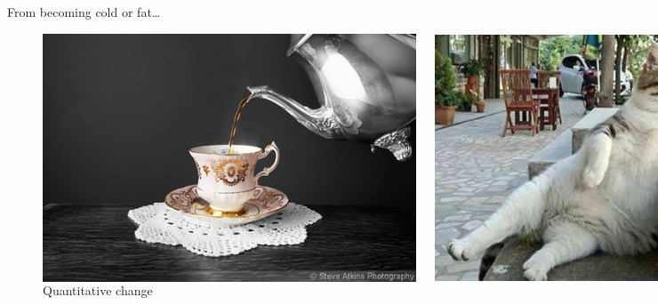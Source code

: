 \documentclass[xcolor=dvipsnames]{beamer}
\begin{document}
\begin{frame}{From becoming cold or fat\ldots}
\begin{figure}
  \centering
  \begin{columns}
    \centering
    \caption {Qualitative change}
    \includegraphics[width=0.99\textwidth]{tea}
    \centering
    \caption {Quantitative change}
    \includegraphics[width=0.99\textwidth]{cat}
  \end{columns}
\end{figure}
\end{frame}
\end{document}
